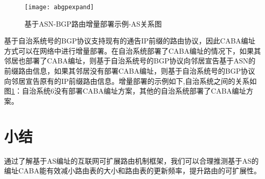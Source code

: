 \begin{figure}
  \centering
  \texttt{[image: abgpexpand]}
  \caption{基于ASN-BGP路由增量部署示例-AS关系图}
  \label{fig:abgpexpand}
\end{figure}

基于自治系统号的BGP协议支持现有的通告IP前缀的路由协议，因此CABA编址方式可以在网络中进行增量部署。在自治系统部署了CABA编址的情况下，如果其邻居也部署了CABA编址，则基于自治系统号的BGP协议向邻居宣告基于ASN的前缀路由信息，如果其邻居没有部署CABA编址，则基于自治系统号的BGP协议向邻居宣告原有的IP前缀路由信息。增量部署的示例如下,自治系统之间的关系如图\ref{fig:abgpexpand}：自治系统6没有部署CABA编址方案，其他的自治系统部署了CABA编址方案。

\section{小结}
通过了解基于AS编址的互联网可扩展路由机制框架，我们可以合理推测基于AS的编址CABA能有效减小路由表的大小和路由表的更新频率，提升路由的可扩展性。

